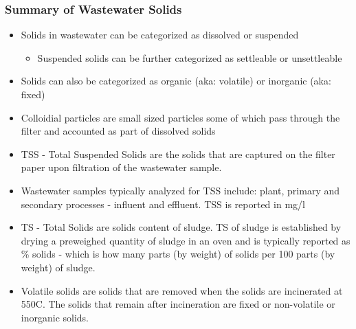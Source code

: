 \documentclass{article}
\begin{document}
	\subsubsection{Summary of Wastewater Solids}		
			\begin{itemize}
				\item Solids in wastewater can be categorized as dissolved or suspended
				      \begin{itemize}
				      	\item Suspended solids can be further categorized as settleable or unsettleable
				      \end{itemize}
				\item Solids can also be categorized as organic (aka: volatile) or inorganic (aka: fixed)
				\item Colloidial particles are small sized particles some of which pass through the filter and accounted as part of dissolved solids
				\item TSS - Total Suspended Solids are the solids that are captured on the filter paper upon filtration of the wastewater sample.  
				\item Wastewater samples typically analyzed for TSS include:  plant, primary and secondary processes - influent and effluent.  TSS is reported in mg/l
				\item TS - Total Solids are solids content of sludge.  TS of sludge is established by drying a preweighed quantity of sludge in an oven and is typically reported as \% solids - which is how many parts (by weight) of solids per 100 parts (by weight) of sludge.
				\item Volatile solids are solids that are removed when the solids are incinerated at 550C.  The solids that remain after incineration are fixed or non-volatile or inorganic solids.
			\end{itemize}
\end{document}
